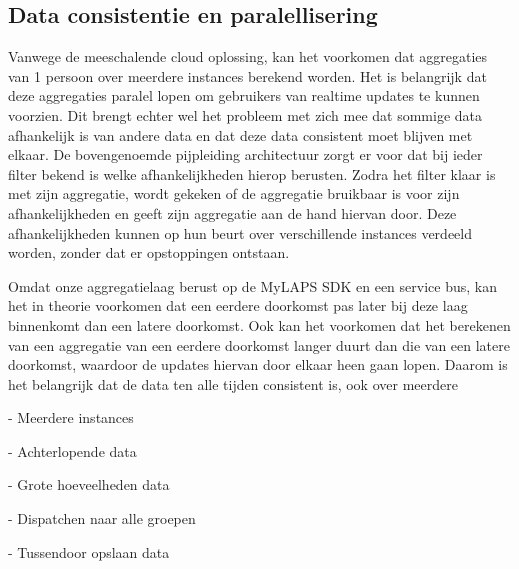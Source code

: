 \begin{itemize}
\subsection{Data consistentie en paralellisering}
Vanwege de meeschalende cloud oplossing, kan het voorkomen dat aggregaties van 1 persoon over meerdere instances berekend worden. Het is belangrijk dat deze aggregaties paralel lopen om gebruikers van realtime updates te kunnen voorzien. Dit brengt echter wel het probleem met zich mee dat sommige data afhankelijk is van andere data en dat deze data consistent moet blijven met elkaar. De bovengenoemde pijpleiding architectuur zorgt er voor dat bij ieder filter bekend is welke afhankelijkheden hierop berusten. Zodra het filter klaar is met zijn aggregatie, wordt gekeken of de aggregatie bruikbaar is voor zijn afhankelijkheden en geeft zijn aggregatie aan de hand hiervan door. Deze afhankelijkheden kunnen op hun beurt over verschillende instances verdeeld worden, zonder dat er opstoppingen ontstaan.

Omdat onze aggregatielaag berust op de MyLAPS SDK en een service bus, kan het in theorie voorkomen dat een eerdere doorkomst pas later bij deze laag binnenkomt dan een latere doorkomst. Ook kan het voorkomen dat het berekenen van een aggregatie van een eerdere doorkomst langer duurt dan die van een latere doorkomst, waardoor de updates hiervan door elkaar heen gaan lopen. Daarom is het belangrijk dat de data ten alle tijden consistent is, ook over meerdere


\end{itemize}

- Meerdere instances

- Achterlopende data

- Grote hoeveelheden data 

- Dispatchen naar alle groepen

- Tussendoor opslaan data